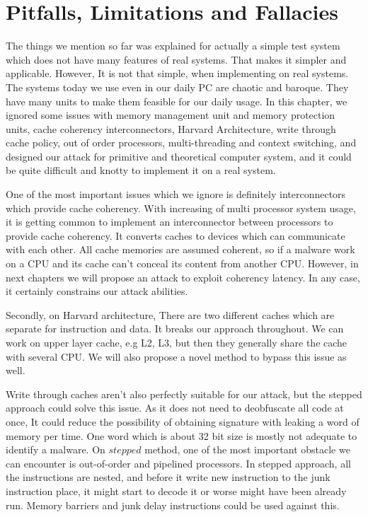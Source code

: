\section{Pitfalls, Limitations and Fallacies}
		The things we mention so far was explained for actually a simple test system which does not have many features of real systems. That makes it simpler and applicable. However, It is not that simple, when implementing on real systems. The systems today we use even in our daily PC are chaotic and baroque. They have many units to make them feasible for our daily usage. In this chapter, we ignored some issues with memory management unit and memory protection units, cache coherency interconnectors, Harvard Architecture, write through cache policy, out of order processors, multi-threading and context switching, and designed our attack for primitive and theoretical computer system, and it could be quite difficult and knotty to implement it on a real system. 

		One of the most important issues which we ignore is definitely interconnectors which provide cache coherency. With increasing of multi processor system usage, it is getting common to implement an interconnector between processors to provide cache coherency. It converts caches to devices which can communicate with each other. All cache memories are assumed coherent, so if a malware work on a CPU and its cache can't conceal its content from another CPU. However, in next chapters we will propose an attack to exploit coherency latency. In any case, it certainly constrains our attack abilities.

		Secondly, on Harvard architecture, There are two different caches which are separate for instruction and data. It breaks our approach throughout. We can work on upper layer cache, e.g L2, L3, but then they generally share the cache with several CPU. We will also propose a novel method to bypass this issue as well.

		Write through caches aren't also perfectly suitable for our attack, but the stepped approach could solve this issue. As it does not need to deobfuscate all code at once, It could reduce the possibility of obtaining signature with leaking a word of memory per time. One word which is about 32 bit size is mostly not adequate to identify a malware. On $stepped$ method, one of the most important obstacle we can encounter is out-of-order and pipelined processors. In stepped approach, all the instructions are nested, and before it write new instruction to the junk instruction place, it might start to decode it or worse might have been already run. Memory barriers and junk delay instructions could be used against this.

